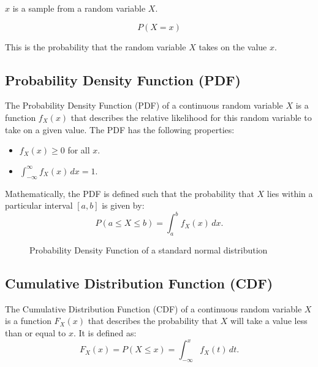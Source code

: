 $x$ is a sample from a random variable $X$. 

\begin{equation}
    P(X=x)
\end{equation}

This is the probability that the random variable $X$ takes on the value $x$.



\subsection{Probability Density Function (PDF)}

The Probability Density Function (PDF) of a continuous random variable \(X\) is a function \(f_X(x)\) that describes the relative likelihood for this random variable to take on a given value. The PDF has the following properties:
\begin{itemize}
    \item \(f_X(x) \geq 0\) for all \(x\).
    \item \(\int_{-\infty}^{\infty} f_X(x) \, dx = 1\).
\end{itemize}

Mathematically, the PDF is defined such that the probability that \(X\) lies within a particular interval \([a, b]\) is given by:
\[
P(a \leq X \leq b) = \int_{a}^{b} f_X(x) \, dx.
\]

\begin{figure}[H]
    \centering
    \caption{Probability Density Function of a standard normal distribution}
\end{figure}

\subsection{Cumulative Distribution Function (CDF)}

The Cumulative Distribution Function (CDF) of a continuous random variable \(X\) is a function \(F_X(x)\) that describes the probability that \(X\) will take a value less than or equal to \(x\). It is defined as:
\[
F_X(x) = P(X \leq x) = \int_{-\infty}^{x} f_X(t) \, dt.
\]

